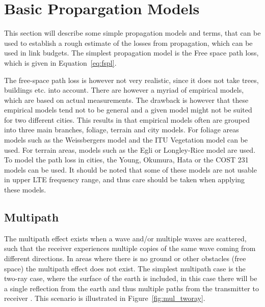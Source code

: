 \section{Basic Propargation Models}
\label{sec:propmodels}
This section will describe some simple propagation models and terms, that can be used to establish a rough estimate of the losses from propagation, which can be used in link budgets. The simplest propagation model is the Free space path loss, which is given in Equation~\ref{eq:fspl}.

The free-space path loss is however not very realistic, since it does not take trees, buildings etc. into account\cite{balanis2012antenna}. There are however a myriad of empirical models, which are based on actual measurements. The drawback is however that these empirical models tend not to be general and a given model might not be suited for two different cities. This results in that empirical models often are grouped into three main branches, foliage, terrain and city models\cite{goldsmith2005wireless}. For foliage areas models such as the Weissbergers model and the ITU Vegetation model can be used\cite{goldsmith2005wireless}. For terrain areas, models such as the Egli or Longley-Rice model are used\cite{goldsmith2005wireless}. To model the path loss in cities, the Young, Okumura, Hata or the COST 231 models can be used\cite{goldsmith2005wireless}. It should be noted that some of these models are not usable in upper LTE frequency range, and thus care should be taken when applying these models. 


\subsection{Multipath}
The multipath effect exists when a wave and/or multiple waves are scattered, such that the receiver experiences multiple copies of the same wave coming from different directions. In areas where there is no ground or other obstacles (free space) the multipath effect does not exist. The simplest multipath case is the two-ray case, where the surface of the earth is included, in this case there will be a single reflection from the earth and thus multiple paths from the transmitter to receiver \cite{}. This scenario is illustrated in Figure~\ref{fig:mul_tworay}.
 
